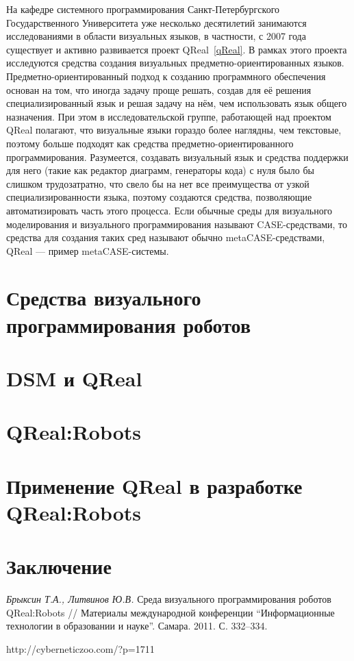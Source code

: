 \documentclass[a4paper]{article}
\begin{document}
На кафедре системного программирования Санкт-Петербургского Государственного Университета уже несколько десятилетий занимаются исследованиями в области визуальных языков, в частности, с 2007 года существует и активно развивается проект QReal~\ref{qReal}. В рамках этого проекта исследуются средства создания визуальных предметно-ориентированных языков. Предметно-ориентированный подход к созданию программного обеспечения основан на том, что иногда задачу проще решать, создав для её решения специализированный язык и решая задачу на нём, чем использовать язык общего назначения. При этом в исследовательской группе, работающей над проектом QReal полагают, что визуальные языки гораздо более наглядны, чем текстовые, поэтому больше подходят как средства предметно-ориентированного программирования. Разумеется, создавать визуальный язык и средства поддержки для него (такие как редактор диаграмм, генераторы кода) с нуля было бы слишком трудозатратно, что свело бы на нет все преимущества от узкой специализированности языка, поэтому создаются средства, позволяющие автоматизировать часть этого процесса. Если обычные среды для визуального моделирования и визуального программирования называют CASE-средствами, то средства для создания таких сред называют обычно metaCASE-средствами, QReal --- пример metaCASE-системы.

\section{Средства визуального программирования роботов}

\section{DSM и QReal}

\section{QReal:Robots}

\section{Применение QReal в разработке QReal:Robots}

\section*{Заключение}

\begin{thebibliography}{9001}

   \emph{Брыксин Т.А., Литвинов Ю.В.} Среда визуального программирования роботов QReal:Robots // Материалы международной конференции ``Информационные технологии в образовании и науке''. Самара. 2011. С. 332--334.
  
   http://cyberneticzoo.com/?p=1711

\end{thebibliography}
\end{document}
